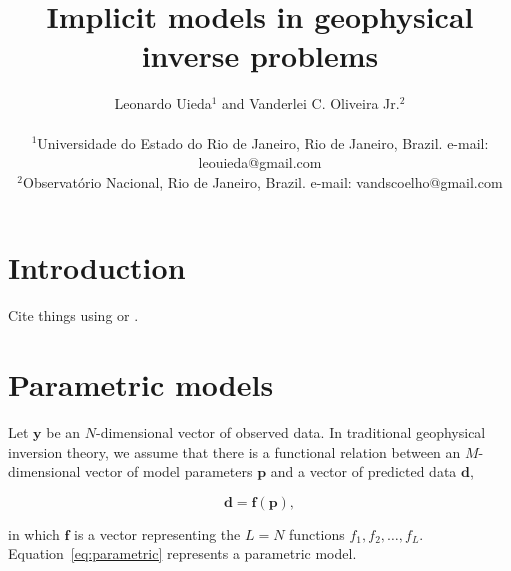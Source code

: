 \documentclass[onecolumn]{article}
\begin{document}
\title{Implicit models in geophysical inverse problems}
\author{
    Leonardo Uieda$^{1}$
    and
    Vanderlei C. Oliveira Jr.$^{2}$
    \\\\
    {\small $^1$Universidade do Estado do Rio de Janeiro, Rio de Janeiro, Brazil.
        e-mail: leouieda@gmail.com}
    \\
    {\small $^2$Observatório Nacional, Rio de Janeiro, Brazil.
        e-mail: vandscoelho@gmail.com}
}


\maketitle


\begin{abstract}
    \lipsum[1]
\end{abstract}


\section{Introduction}

Cite things using \citet{tikhonov1977} or \citep{tikhonov1977}.



\section{Parametric models}

Let $\mathbf{y}$ be an $N$-dimensional vector of observed data.
In traditional geophysical inversion theory,
we assume that there is a functional relation between
an $M$-dimensional vector of model parameters $\mathbf{p}$
and a vector of predicted data $\mathbf{d}$,

\begin{equation}
    \mathbf{d} = \mathbf{f}(\mathbf{p}),
    \label{eq:parametric}
\end{equation}

\noindent
in which $\mathbf{f}$ is a vector representing the $L = N$ functions
$f_1, f_2, \ldots, f_L$.
Equation~\ref{eq:parametric} represents a parametric model.
\end{document}
